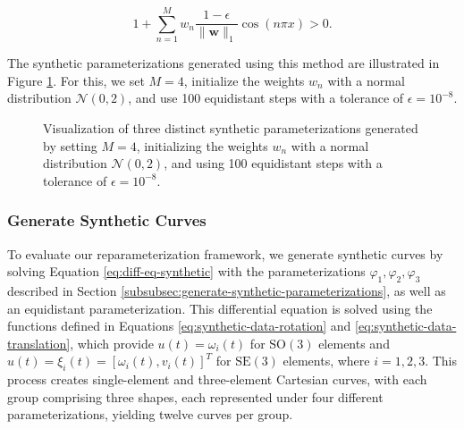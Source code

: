 \begin{equation}
    1 + \sum_{n=1}^{M} w_n \frac{1 - \epsilon}{\|\mathbf{w}\|_1} \cos(n \pi x) > 0.
\end{equation}

The synthetic parameterizations generated using this method are illustrated in Figure \ref{fig:synthetic-parameterizations}. For this, we set \(M = 4\), initialize the weights \(w_n\) with a normal distribution \(\mathcal{N}(0, 2)\), and use 100 equidistant steps with a tolerance of \(\epsilon = 10^{-8}\).

\begin{figure}
    \caption[Visualization of the Synthetic Parameterizations]{Visualization of three distinct synthetic parameterizations generated by setting \(M = 4\), initializing the weights \(w_n\) with a normal distribution \(\mathcal{N}(0, 2)\), and using 100 equidistant steps with a tolerance of \(\epsilon = 10^{-8}\).}
    \label{fig:synthetic-parameterizations}
\end{figure}

\FloatBarrier
\subsubsection{Generate Synthetic Curves}
\label{subsubsec:synthetic-curves}

To evaluate our reparameterization framework, we generate synthetic curves by solving Equation \eqref{eq:diff-eq-synthetic} with the parameterizations \(\varphi_1, \varphi_2, \varphi_3\) described in Section \ref{subsubsec:generate-synthetic-parameterizations}, as well as an equidistant parameterization. This differential equation is solved using the functions defined in Equations \eqref{eq:synthetic-data-rotation} and \eqref{eq:synthetic-data-translation}, which provide \(u(t) = \omega_i(t)\) for \(\mathrm{SO}(3)\) elements and \(u(t) = \xi_i(t) = [\omega_i(t), v_i(t)]^T\) for \(\mathrm{SE}(3)\) elements, where \(i = 1,2,3\). This process creates single-element and three-element Cartesian curves, with each group comprising three shapes, each represented under four different parameterizations, yielding twelve curves per group.

